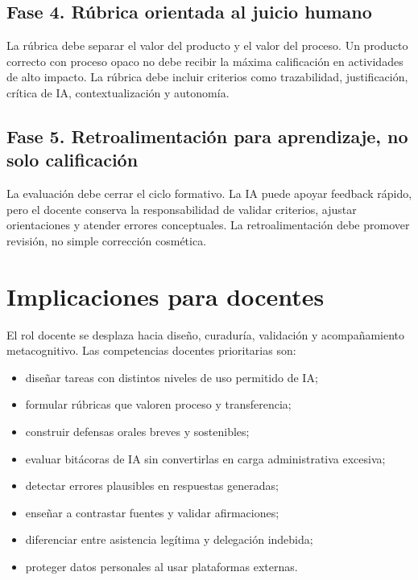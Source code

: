 \documentclass[
  spanish,
  letterpaper,
  DIV=11,
  numbers=noendperiod]{scrartcl}
\providecommand{\tightlist}{%
  \setlength{\itemsep}{0pt}\setlength{\parskip}{0pt}}
\begin{document}
\subsection{Fase 4. Rúbrica orientada al juicio
humano}\label{fase-4.-ruxfabrica-orientada-al-juicio-humano}

La rúbrica debe separar el valor del producto y el valor del proceso. Un
producto correcto con proceso opaco no debe recibir la máxima
calificación en actividades de alto impacto. La rúbrica debe incluir
criterios como trazabilidad, justificación, crítica de IA,
contextualización y autonomía.

\subsection{Fase 5. Retroalimentación para aprendizaje, no solo
calificación}\label{fase-5.-retroalimentaciuxf3n-para-aprendizaje-no-solo-calificaciuxf3n}

La evaluación debe cerrar el ciclo formativo. La IA puede apoyar
feedback rápido, pero el docente conserva la responsabilidad de validar
criterios, ajustar orientaciones y atender errores conceptuales. La
retroalimentación debe promover revisión, no simple corrección
cosmética.

\section{Implicaciones para docentes}\label{implicaciones-para-docentes}

El rol docente se desplaza hacia diseño, curaduría, validación y
acompañamiento metacognitivo. Las competencias docentes prioritarias
son:

\begin{itemize}
\tightlist
\item
  diseñar tareas con distintos niveles de uso permitido de IA;
\item
  formular rúbricas que valoren proceso y transferencia;
\item
  construir defensas orales breves y sostenibles;
\item
  evaluar bitácoras de IA sin convertirlas en carga administrativa
  excesiva;
\item
  detectar errores plausibles en respuestas generadas;
\item
  enseñar a contrastar fuentes y validar afirmaciones;
\item
  diferenciar entre asistencia legítima y delegación indebida;
\item
  proteger datos personales al usar plataformas externas.
\end{itemize}
\end{document}
